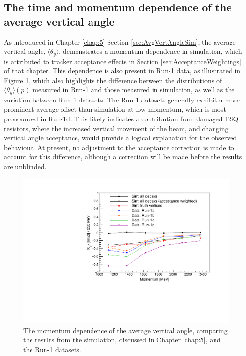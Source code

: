 \subsection{The time and momentum dependence of the average vertical angle}\label{subsec:AvgVertAngleData}

As introduced in Chapter \ref{chap:5} Section \ref{sec:AvgVertAngleSim}, the average vertical angle, $\langle \theta_{y} \rangle$, demonstrates a momentum dependence in simulation, which is attributed to tracker acceptance effects in Section \ref{sec:AcceptanceWeightings} of that chapter. This dependence is also present in Run-1 data, as illustrated in Figure \ref{fig:AvgVertAngleDataAndSim}, which also highlights the difference between the distributions of $\langle \theta_{y} \rangle(p)$ measured in Run-1 and those measured in simulation, as well as the variation between Run-1 datasets. The Run-1 datasets generally exhibit a more prominent average offset than simulation at low momentum, which is most pronounced in Run-1d. This likely indicates a contribution from damaged ESQ resistors, where the increased vertical movement of the beam, and changing vertical angle acceptance, would provide a logical explanation for the observed behaviour. At present, no adjustment to the acceptance correction is made to account for this difference, although a correction will be made before the results are unblinded.

\begin{figure}[h!]
\centering{}
\includegraphics[trim={0 0 0 0cm},clip,width=.69\textwidth]{Images/Chapter6/verticalOffsetIllustration_noVertCorr.pdf}
\caption{The momentum dependence of the average vertical angle, comparing the results from the simulation, discussed in Chapter \ref{chap:5}, and the Run-1 datasets.}
\label{fig:AvgVertAngleDataAndSim}
\end{figure} 


